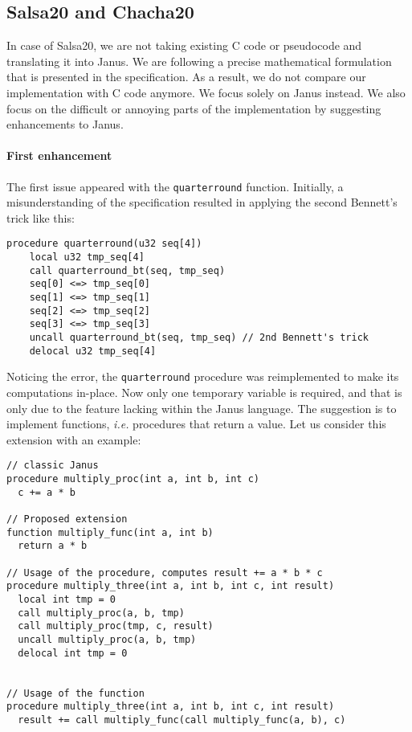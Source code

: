 \documentclass[a4paper,10pt,openright]{memoir}
\newcommand{\ie}{\emph{i.e.}\xspace}
\newcommand{\code}[1]{\texttt{#1}}
\begin{document}
\subsection{Salsa20 and Chacha20}
\label{sec:impl:salsa}

In case of Salsa20, we are not taking existing C code or pseudocode and 
translating it into Janus. We are following a precise mathematical 
formulation that is presented in the specification\cite{salsa}. As a 
result, we do not compare our implementation with C code anymore. We 
focus solely on Janus instead. We also focus on the difficult or 
annoying parts of the implementation by suggesting enhancements to 
Janus.

\paragraph{First enhancement}

The first issue appeared with the \code{quarterround} function. Initially, a 
misunderstanding of the specification resulted in applying the second 
Bennett's trick like this:

\begin{lstlisting}[language=Janus]
procedure quarterround(u32 seq[4])
	local u32 tmp_seq[4]
	call quarterround_bt(seq, tmp_seq)
	seq[0] <=> tmp_seq[0]
	seq[1] <=> tmp_seq[1]
	seq[2] <=> tmp_seq[2]
	seq[3] <=> tmp_seq[3]
	uncall quarterround_bt(seq, tmp_seq) // 2nd Bennett's trick
	delocal u32 tmp_seq[4]
\end{lstlisting}

Noticing the error, the \code{quarterround} procedure was reimplemented 
to make its computations in-place. Now only one temporary variable is 
required, and that is only due to the feature lacking within the Janus 
language. The suggestion is to implement functions, \ie procedures that 
return a value. Let us consider this extension with an example:

\begin{lstlisting}[language=Janus]
// classic Janus
procedure multiply_proc(int a, int b, int c)
  c += a * b

// Proposed extension
function multiply_func(int a, int b)
  return a * b

// Usage of the procedure, computes result += a * b * c
procedure multiply_three(int a, int b, int c, int result)
  local int tmp = 0
  call multiply_proc(a, b, tmp)
  call multiply_proc(tmp, c, result)
  uncall multiply_proc(a, b, tmp)
  delocal int tmp = 0


// Usage of the function
procedure multiply_three(int a, int b, int c, int result)
  result += call multiply_func(call multiply_func(a, b), c)
\end{lstlisting}
\end{document}
